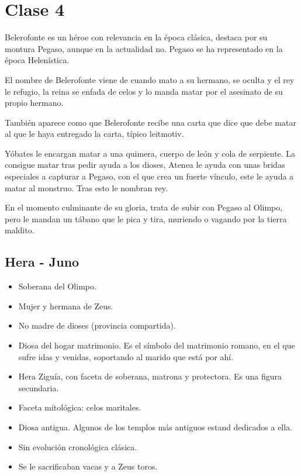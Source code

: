 \chapter{Clase 4}\label{ch:clase4}
Belerofonte es un héroe con relevancia en la época clásica, destaca por su montura Pegaso, aunque en la actualidad no. Pegaso se ha representado en la época Helenística.

El nombre de Belerofonte viene de cuando mato a su hermano, se oculta y el rey le refugio, la reina se enfada de celos y lo manda matar por el asesinato de su propio hermano.

También aparece como que Belerofonte recibe una carta que dice que debe matar al que le haya entregado la carta, típico leitmotiv.

Yóbates le encargan matar a una quimera, cuerpo de león y cola de serpiente. La consigue matar tras pedir ayuda a los dioses, Atenea le ayuda con unas bridas especiales a capturar a Pegaso, con el que crea un fuerte vínculo, este le ayuda a matar al monstruo. Tras esto le nombran rey. 

En el momento culminante de su gloria, trata de subir con Pegaso al Olimpo, pero le mandan un tábano que le pica y tira, muriendo o vagando por la tierra maldito.

\section{Hera - Juno}
\begin{itemize}
    \item Soberana del Olimpo.
    \item Mujer y hermana de Zeus.
    \item No madre de dioses (provincia compartida).
    \item Diosa del hogar matrimonio. Es el símbolo del matrimonio romano, en el que sufre idas y venidas, soportando al marido que está por ahí.
    \item Hera Ziguía, con faceta de soberana, matrona y protectora. Es una figura secundaria.
    \item Faceta mitológica: celos maritales.
    \item Diosa antigua. Algunos de los templos más antiguos estand dedicados a ella.
    \item Sin evolución cronológica clásica.
    \item Se le sacrificaban vacas y a Zeus toros.
\end{itemize}
\pagebreak

